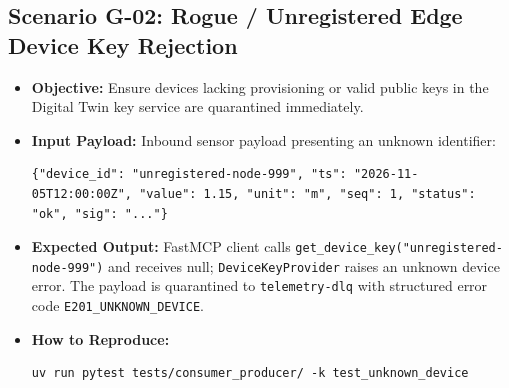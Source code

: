 \documentclass[11pt,a4paper]{article}
\begin{document}
\subsection{Scenario G-02: Rogue / Unregistered Edge Device Key Rejection}
\begin{itemize}[leftmargin=*,itemsep=1.5pt]
  \item \textbf{Objective:} Ensure devices lacking provisioning or valid public keys in the Digital Twin key service are quarantined immediately.
  \item \textbf{Input Payload:} Inbound sensor payload presenting an unknown identifier:
\begin{lstlisting}
{"device_id": "unregistered-node-999", "ts": "2026-11-05T12:00:00Z", "value": 1.15, "unit": "m", "seq": 1, "status": "ok", "sig": "..."}
\end{lstlisting}
  \item \textbf{Expected Output:} FastMCP client calls \texttt{get\_device\_key("unregistered-node-999")} and receives null; \texttt{DeviceKeyProvider} raises an unknown device error. The payload is quarantined to \texttt{telemetry-dlq} with structured error code \texttt{E201\_UNKNOWN\_DEVICE}.
  \item \textbf{How to Reproduce:}
\begin{lstlisting}
uv run pytest tests/consumer_producer/ -k test_unknown_device
\end{lstlisting}
\end{itemize}
\end{document}

